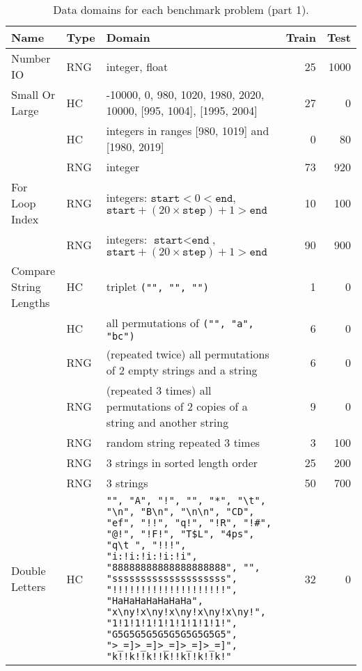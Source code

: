\documentclass{sig-alternate}
\begin{document}

\begin{table*}
\centering
\caption{Data domains for each benchmark problem (part 1).}
\label{datadomains1}
\begin{tabular}{>{\raggedright}p{3.5cm} l >{\raggedright}p{9.8cm} rr}
\toprule
\textbf{Name} & \textbf{Type} & \textbf{Domain} & \textbf{Train} & \textbf{Test} \\
\midrule
Number IO & RNG & integer, float & 25 & 1000 \tabularnewline
\rowcolor{Gray} Small Or Large & HC & -10000, 0, 980, 1020, 1980, 2020, 10000, [995, 1004], [1995, 2004] & 27 & 0 \tabularnewline
\rowcolor{Gray}  & HC & integers in ranges [980, 1019] and [1980, 2019] & 0 & 80 \tabularnewline
\rowcolor{Gray}  & RNG & integer & 73 & 920 \tabularnewline
For Loop Index & RNG & integers: $\texttt{start} < 0 < \texttt{end}$, $ \texttt{start} + (20 \times \texttt{step}) + 1 > \texttt{end}$ & 10 & 100 \tabularnewline
 & RNG & integers: $\texttt{start} < \texttt{end}$, $ \texttt{start} + (20 \times \texttt{step}) + 1 > \texttt{end}$ & 90 & 900 \tabularnewline
\rowcolor{Gray} Compare String Lengths & HC & triplet \texttt{("", "", "")} & 1 & 0 \tabularnewline
\rowcolor{Gray}  & HC & all permutations of \texttt{("", "a", "bc")} & 6 & 0 \tabularnewline
\rowcolor{Gray}  & RNG & (repeated twice) all permutations of 2 empty strings and a string & 6 & 0 \tabularnewline
\rowcolor{Gray}  & RNG & (repeated 3 times) all permutations of 2 copies of a string and another string & 9 & 0 \tabularnewline
\rowcolor{Gray}  & RNG & random string repeated 3 times & 3 & 100 \tabularnewline
\rowcolor{Gray}  & RNG & 3 strings in sorted length order & 25 & 200 \tabularnewline
\rowcolor{Gray}  & RNG & 3 strings & 50 & 700 \tabularnewline
Double Letters & HC & \texttt{"", "A", "!", "\textvisiblespace", "*", "\textbackslash t", "\textbackslash n", "B\textbackslash n", "\textbackslash n\textbackslash n", "CD", "ef", "!!", "q!", "!R", "!\#", "@!", "!F!", "T\$L", "4ps", "q\textbackslash t ", "!!!", "i:!i:!i:!i:!i", "88888888888888888888", "\textvisiblespace\textvisiblespace\textvisiblespace\textvisiblespace \textvisiblespace\textvisiblespace\textvisiblespace\textvisiblespace \textvisiblespace\textvisiblespace\textvisiblespace\textvisiblespace \textvisiblespace\textvisiblespace\textvisiblespace\textvisiblespace \textvisiblespace\textvisiblespace\textvisiblespace\textvisiblespace", "ssssssssssssssssssss", "!!!!!!!!!!!!!!!!!!!!", "Ha\textvisiblespace Ha\textvisiblespace Ha\textvisiblespace Ha\textvisiblespace Ha\textvisiblespace Ha\textvisiblespace Ha", "x\textbackslash ny!x\textbackslash ny!x\textbackslash ny!x\textbackslash ny!x\textbackslash ny!", "1!1!1!1!1!1!1!1!1!1!", "G5G5G5G5G5G5G5G5G5G5", ">_=]>_=]>_=]>_=]>_=]", "k!!k!!k!!k!!k!!k!!k!"} & 32 & 0 \tabularnewline

\end{tabular}
\end{table*}
\end{document}

